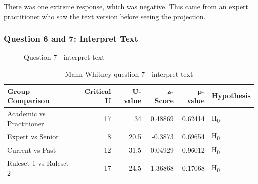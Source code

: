 There was one extreme response, which was negative.
This came from an expert practitioner who saw the text version before seeing the projection.

\subsubsection{Question 6 and 7: Interpret Text}

\begin{figure}[H]
    \centering
    \caption{Question 7 - interpret text}
    \label{fig:stackedbar_Q3}
\end{figure}

\begin{table}[H]
    \begin{center}
        \begin{tabular}{ |l ||r |r |r | r|l | } 
            \hline
            Group Comparison                 & Critical U & U-value & z-Score  & p-value & Hypothesis         \\
            \hline
            \hline
            Academic vs Practitioner         & 17         & 34      &  0.48869 & 0.62414 & H\textsubscript{0} \\ 
            \hline
            Expert vs Senior                 & 8          & 20.5    &  -0.3873 & 0.69654 & H\textsubscript{0} \\ 
            \hline
            Current vs Past                  & 12         & 31.5    &  -0.04929& 0.96012 & H\textsubscript{0} \\ 
            \hline
            Ruleset 1 vs Ruleset 2           & 17         & 24.5    &  -1.36868& 0.17068 & H\textsubscript{0} \\ 
            \hline
        \end{tabular}
    \end{center}
    \caption{Mann-Whitney question 7 - interpret text}
    \label{table:mannwhitneyQ3}
\end{table}

